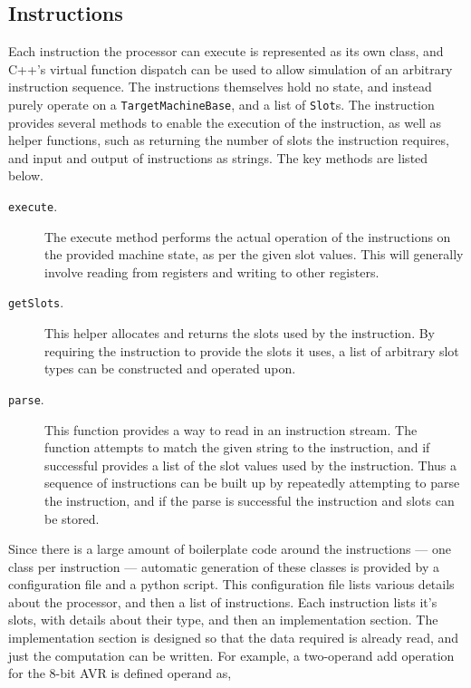\documentclass{article}
\begin{document}
\subsection{Instructions}

Each instruction the processor can execute is represented as its own class, and C++'s virtual function dispatch can be used to allow simulation of an arbitrary instruction sequence. The instructions themselves hold no state, and instead purely operate on a \texttt{TargetMachineBase}, and a list of \texttt{Slot}s. The instruction provides several methods to enable the execution of the instruction, as well as helper functions, such as returning the number of slots the instruction requires, and input and output of instructions as strings. The key methods are listed below.

\begin{description}
    \item[\texttt{execute}.] The execute method performs the actual operation of the instructions on the provided machine state, as per the given slot values. This will generally involve reading from registers and writing to other registers.
    \item[\texttt{getSlots}.] This helper allocates and returns the slots used by the instruction. By requiring the instruction to provide the slots it uses, a list of arbitrary slot types can be constructed and operated upon.
    \item[\texttt{parse}.] This function provides a way to read in an instruction stream. The function attempts to match the given string to the instruction, and if successful provides a list of the slot values used by the instruction. Thus a sequence of instructions can be built up by repeatedly attempting to parse the instruction, and if the parse is successful the instruction and slots can be stored.
\end{description}

Since there is a large amount of boilerplate code around the instructions --- one class per instruction --- automatic generation of these classes is provided by a configuration file and a python script. This configuration file lists various details about the processor, and then a list of instructions. Each instruction lists it's slots, with details about their type, and then an implementation section. The implementation section is designed so that the data required is already read, and just the computation can be written. For example, a two-operand add operation for the 8-bit AVR is defined operand as,
\end{document}
